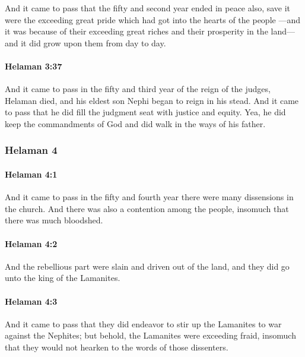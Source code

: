 			And it came to pass that the fifty and second year ended in peace also,
			save it were the exceeding great pride
			which had got into the hearts of the people
			---and it was because of their exceeding great riches and their prosperity in the land---
			and it did grow upon them from day to day.

		\paragraph{Helaman 3:37} %
			\label{HELAMAN-3-37}

			And it came to pass in the fifty and third year of the reign of the judges,
			Helaman died, and his eldest son Nephi began to reign in his stead.
			And it came to pass that he did fill the judgment seat with justice and equity.
			Yea, he did keep the commandments of God
			and did walk in the ways of his father.

	\subsubsection{Helaman 4} %
		\label{HELAMAN-4}
		
		\paragraph{Helaman 4:1} %
			\label{HELAMAN-4-1}

			And it came to pass in the fifty and fourth year
			there were many dissensions in the church.
			And there was also a contention among the people,
			insomuch that there was much bloodshed.

		\paragraph{Helaman 4:2} %
			\label{HELAMAN-4-2}

			And the rebellious part were slain and driven out of the land,
			and they did go unto the king of the Lamanites.

		\paragraph{Helaman 4:3} %
			\label{HELAMAN-4-3}

			And it came to pass that they did endeavor
			to stir up the Lamanites to war against the Nephites;
			but behold, the Lamanites were exceeding fraid,
			insomuch that they would not hearken to the words of those dissenters.

